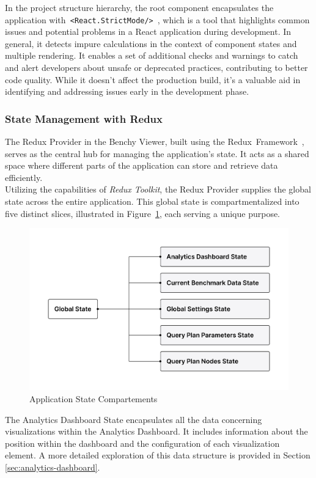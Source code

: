 In the project structure hierarchy, the root component encapsulates the application with\texttt{ <React.StrictMode/>}~\parencite{reactstrictmode}, which is a tool that highlights common issues and potential problems in a React application during development.
In general, it detects impure calculations in the context of component states and multiple rendering. It enables a set of additional checks and warnings to catch and alert developers about unsafe or deprecated practices, contributing to better code quality. While it doesn't affect the production build, it's a valuable aid in identifying and addressing issues early in the development phase.


\subsubsection{State Management with Redux}
The Redux Provider in the Benchy Viewer, built using the Redux~Framework~\parencite{Redux}, serves as the central hub for managing the application's state. It acts as a shared space where different parts of the application can store and retrieve data efficiently.\\
Utilizing the capabilities of \textit{Redux Toolkit}\parencite{redux-toolkit}, the Redux Provider supplies the global state across the entire application. This global state is compartmentalized into five distinct slices, illustrated in Figure~\ref{fig:global-state}, each serving a unique purpose.

\begin{figure}[h]
  \centering
  \includegraphics[width=0.8\linewidth]{figures/global-state.png}
  \caption{Application State Compartements}
  \label{fig:global-state}
\end{figure}

The Analytics Dashboard State encapsulates all the data concerning visualizations within the Analytics Dashboard. It includes information about the position within the dashboard and the configuration of each visualization element. A more detailed exploration of this data structure is provided in Section \ref{sec:analytics-dashboard}.

